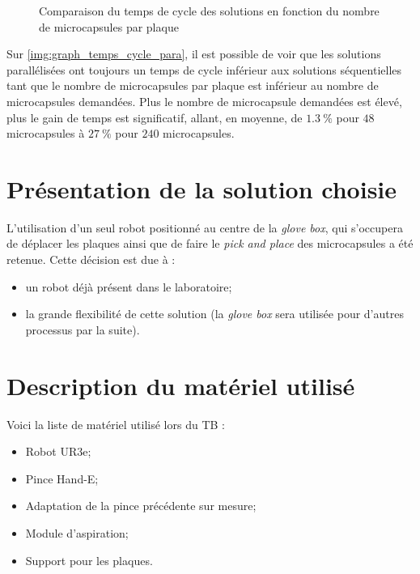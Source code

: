 \begin{figure}[H]
    \centering
    
    \caption{Comparaison du temps de cycle des solutions en fonction du nombre de microcapsules par plaque}
    \label{img:graph_temps_cycle_para}
\end{figure}

Sur \autoref{img:graph_temps_cycle_para}, il est possible de voir que les solutions parallélisées ont toujours un temps de cycle inférieur aux solutions séquentielles tant que le nombre de microcapsules par plaque est inférieur au nombre de microcapsules demandées.
Plus le nombre de microcapsule demandées est élevé, plus le gain de temps est significatif, allant, en moyenne, de $1.3~\%$ pour $48$ microcapsules à $27~\%$ pour $240$ microcapsules.
\section{Présentation de la solution choisie}
L'utilisation d'un seul robot positionné au centre de la \textit{glove box}, qui s'occupera de déplacer les plaques ainsi que de faire le \textit{pick and place} des microcapsules a été retenue.
Cette décision est due à : 
\begin{itemize}
    \item un robot déjà présent dans le laboratoire;
    \item la grande flexibilité de cette solution (la \textit{glove box} sera utilisée pour d'autres processus par la suite).
\end{itemize}
\section{Description du matériel utilisé}
Voici la liste de matériel utilisé lors du TB : 
\begin{itemize}
    \item Robot \og{}UR3e\fg{};
    \item Pince \og{}Hand-E\fg{};
    \item Adaptation de la pince précédente sur mesure;
    \item Module d'aspiration;
    \item Support pour les plaques.
\end{itemize}

